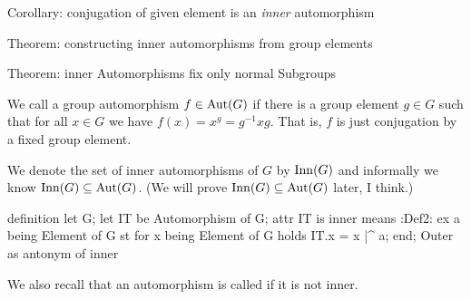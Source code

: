 \LA{}Corollary: conjugation of given element is an \emph{inner} automorphism~{\nwtagstyle{}}\RA{}

\LA{}Theorem: constructing inner automorphisms from group elements~{\nwtagstyle{}}\RA{}

\LA{}Theorem: inner Automorphisms fix only normal Subgroups~{\nwtagstyle{}}\RA{}
\nwendcode{}\nwdocspar

\begin{definition}
We call a group automorphism $f\in\operatorname{Aut}(G)$  if there is a
group element $g\in G$ such that for all $x\in G$ we have $f(x) = x^{g} = g^{-1}xg$.
That is, $f$ is just conjugation by a fixed group element.
\end{definition}

\begin{def-remark}
We denote the set of inner automorphisms of $G$ by $\operatorname{Inn}(G)$ and
informally we know $\operatorname{Inn}(G)\subseteq\operatorname{Aut}(G)$. (We will prove
$\operatorname{Inn}(G)\subseteq\operatorname{Aut}(G)$ later, I think.)
\end{def-remark}

\nwenddocs{}\endmoddef\nwstartdeflinemarkup{}\nwenddeflinemarkup
definition
  let G;
  let IT be Automorphism of G;
  attr IT is inner means
  :Def2:
  ex a being Element of G st
  for x being Element of G holds IT.x = x |^ a;
end;
\LA{}Outer as antonym of inner~{\nwtagstyle{}}\RA{}
\eatline
{}\nwendcode{}\nwdocspar
\begin{notation}
We also recall that an automorphism is called  if it is
not inner.
\end{notation}


